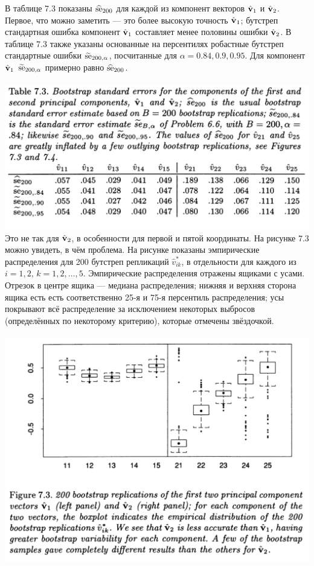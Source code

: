 В таблице 7.3 показаны $\widehat{\text{se}}_{200}$ для каждой из компонент векторов $\hat{\mathbf{v}}_1$ и $\hat{\mathbf{v}}_2$. Первое, что можно заметить --- это более высокую точность $\hat{\mathbf{v}}_1$; бутстреп стандартная ошибка компонент $\hat{\mathbf{v}}_1$ составляет менее половины ошибки $\hat{\mathbf{v}}_2$. В таблице 7.3 также указаны основанные на персентилях робастные бутстреп стандартные ошибки $\widetilde{\text{se}}_{200,\alpha}$, посчитанные для $\alpha = 0.84, 0.9, 0.95$. Для компонент $\hat{\mathbf{v}}_1$ $\widetilde{\text{se}}_{200, \alpha}$ примерно равно $\widehat{\text{se}}_{200}$. 
\\~\\
\noindent
\includegraphics[width=0.9\linewidth]{6/t73.png}
\newline
\setcounter{table}{3}
Это не так для $\hat{\mathbf{v}}_2$, в особенности для первой и пятой координаты. На рисунке 7.3 можно увидеть, в чём проблема. На рисунке показаны эмпирические распределения для 200 бутстреп репликаций $\hat v_{ik}^*$, в отдельности для каждого из $i = 1,2,\, k = 1,2,\ldots, 5$. Эмпирические распределения отражены ящиками с усами. Отрезок в центре ящика --- медиана распределения; нижняя и верхняя сторона ящика есть есть соответственно 25-я и 75-я персентиль распределения; усы покрывают всё распределение за исключением некоторых выбросов (определённых по некоторому критерию), которые отмечены звёздочкой.
\\~\\
\noindent
\includegraphics[width=0.9\linewidth]{6/f73.png}
\newline
\setcounter{figure}{3}

